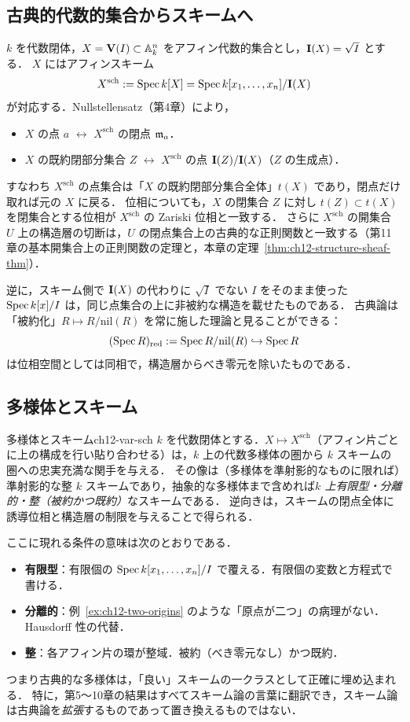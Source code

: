 \subsection{古典的代数的集合からスキームへ}

$k$ を代数閉体，$X=\mathbf{V}(I)\subset\mathbb{A}^n_k$ をアフィン代数的集合とし，$\mathbf{I}(X)=\sqrt I$ とする．
$X$ にはアフィンスキーム
\[
  X^{\mathrm{sch}}:=\operatorname{Spec} k[X]=\operatorname{Spec} k[x_1,\dots,x_n]/\mathbf{I}(X)
\]
が対応する．Nullstellensatz（第4章）により，
\begin{itemize}
  \item $X$ の点 $a$ $\longleftrightarrow$ $X^{\mathrm{sch}}$ の閉点 $\mathfrak{m}_a$．
  \item $X$ の既約閉部分集合 $Z$ $\longleftrightarrow$ $X^{\mathrm{sch}}$ の点 $\mathbf{I}(Z)/\mathbf{I}(X)$（$Z$ の生成点）．
\end{itemize}
すなわち $X^{\mathrm{sch}}$ の点集合は「$X$ の既約閉部分集合全体」$t(X)$ であり，閉点だけ取れば元の $X$ に戻る．
位相についても，$X$ の閉集合 $Z$ に対し $t(Z)\subset t(X)$ を閉集合とする位相が $X^{\mathrm{sch}}$ の Zariski 位相と一致する．
さらに $X^{\mathrm{sch}}$ の開集合 $U$ 上の構造層の切断は，$U$ の閉点集合上の古典的な正則関数と一致する（第11章の基本開集合上の正則関数の定理と，本章の定理~\ref{thm:ch12-structure-sheaf-thm}）．

逆に，スキーム側で $\mathbf{I}(X)$ の代わりに $\sqrt{I}$ でない $I$ をそのまま使った $\operatorname{Spec} k[x]/I$ は，同じ点集合の上に非被約な構造を載せたものである．
古典論は「被約化」$R\mapsto R/\mathrm{nil}(R)$ を常に施した理論と見ることができる：
\[
  (\operatorname{Spec} R)_{\mathrm{red}} := \operatorname{Spec} R/\mathrm{nil}(R)\hookrightarrow\operatorname{Spec} R
\]
は位相空間としては同相で，構造層からべき零元を除いたものである．

\subsection{多様体とスキーム}

\begin{mythm}{多様体とスキーム}{ch12-var-sch}
$k$ を代数閉体とする．$X\mapsto X^{\mathrm{sch}}$（アフィン片ごとに上の構成を行い貼り合わせる）は，$k$ 上の代数多様体の圏から $k$ スキームの圏への忠実充満な関手を与える．
その像は（多様体を準射影的なものに限れば）準射影的な整 $k$ スキームであり，抽象的な多様体まで含めれば\emph{$k$ 上有限型・分離的・整（被約かつ既約）}なスキームである．
逆向きは，スキームの閉点全体に誘導位相と構造層の制限を与えることで得られる．
\end{mythm}

ここに現れる条件の意味は次のとおりである．
\begin{itemize}
  \item \textbf{有限型}：有限個の $\operatorname{Spec} k[x_1,\dots,x_n]/I$ で覆える．有限個の変数と方程式で書ける．
  \item \textbf{分離的}：例~\ref{ex:ch12-two-origins} のような「原点が二つ」の病理がない．Hausdorff 性の代替．
  \item \textbf{整}：各アフィン片の環が整域．被約（べき零元なし）かつ既約．
\end{itemize}
つまり古典的な多様体は，「良い」スキームの一クラスとして正確に埋め込まれる．
特に，第5〜10章の結果はすべてスキーム論の言葉に翻訳でき，スキーム論は古典論を\emph{拡張}するものであって置き換えるものではない．

